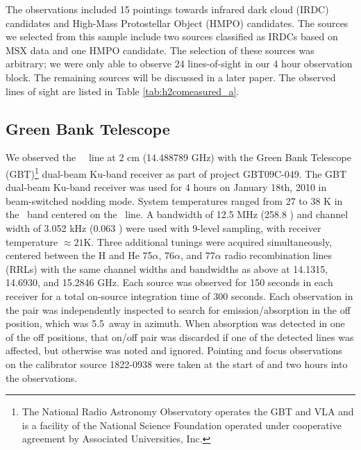 The \citet{Araya2004} observations included 15 pointings towards infrared dark cloud
(IRDC) candidates and High-Mass Protostellar Object (HMPO) candidates.  The
sources we selected from this sample include two sources classified as IRDCs
based on MSX data and one HMPO candidate.  The selection of these sources was
arbitrary; we were only able to observe 24 lines-of-sight in our 4 hour
observation block.  The remaining sources will be discussed in a later paper.
The observed lines of sight are listed in Table \ref{tab:h2comeasured_a}.







\subsection{Green Bank Telescope}
We observed the \formaldehyde\ \twotwo\ line at 2 cm (14.488789 GHz) with the
Green Bank Telescope (GBT)\footnote{ The National Radio Astronomy Observatory operates
the GBT and VLA and is a facility of the National Science Foundation operated
under cooperative agreement by Associated Universities, Inc.  } dual-beam
Ku-band receiver as part of project GBT09C-049.  The GBT dual-beam Ku-band
receiver was used for 4 hours on January 18th, 2010 in beam-switched nodding
mode.  System temperatures ranged from 27 to 38 K in the \formaldehyde\
band centered on the  \twotwo\ line. A bandwidth of 12.5 MHz
(258.8 \kms) and channel width of 3.052 kHz (0.063 \kms) were used with 9-level
sampling, with receiver temperature $\approx21$K.   Three additional tunings
were acquired simultaneously, centered between the H and He 75$\alpha$,
76$\alpha$, and 77$\alpha$ radio recombination lines (RRLs) with the same channel widths and
bandwidths as above at 14.1315, 14.6930, and 15.2846 GHz.  Each source was
observed for 150 seconds in each receiver for a total on-source integration
time of 300 seconds.  Each observation in the pair was independently inspected
to search for emission/absorption in the off position, which was 5.5\arcmin\
away in azimuth.  When absorption was detected in one of the off positions,
that on/off pair was discarded if one of the detected lines was affected, but
otherwise was noted and ignored.  Pointing and focus observations on the
calibrator source 1822-0938 were taken at the start of and two hours into the
observations.  

